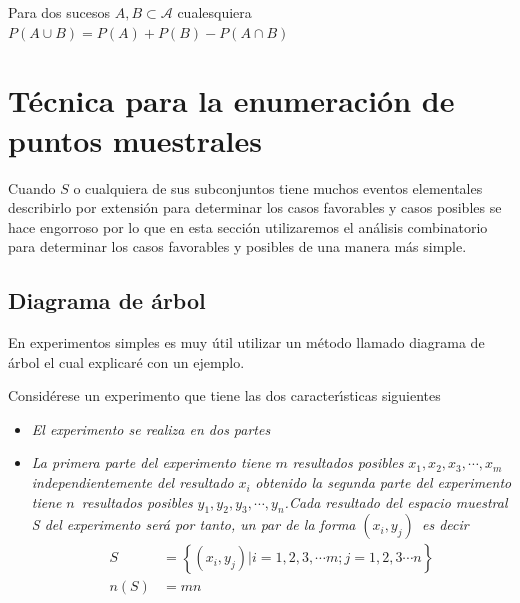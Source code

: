 \documentclass{article}%
\begin{document}
\begin{theorem}
Para dos sucesos $A,B\subset\mathcal{A}$ cualesquiera $P\left(   A\cup
B\right)   =P\left(   A\right)   +P\left(   B\right)   -P\left(   A\cap
B\right)   $
\end{theorem}

\section{T\'{e}cnica para la enumeraci\'{o}n de puntos muestrales}

Cuando $S$ o cualquiera de sus subconjuntos tiene muchos eventos elementales
describirlo por extensi\'{o}n para determinar los casos favorables y casos
posibles se hace engorroso por lo que en esta se\-cci\'{o}n utilizaremos el
an\'{a}lisis combinatorio para determinar los casos favorables y posibles de
una manera m\'{a}s simple.

\subsection{Diagrama de \'{a}rbol}

En experimentos simples es muy \'{u}til utilizar un m\'{e}todo llamado
diagrama de \'{a}rbol el cual explicar\'{e} con un ejemplo.%

\begin{theorem}
Consid\'{e}rese un experimento que tiene las dos cara\-cter\'{\i}sticas
siguientes
\end{theorem}

\begin{itemize}
\item \textit{El experimento se realiza en dos partes }

\item \textit{La primera parte del experimento tiene }$m$ \textit{resultados
posibles }$x_{1},x_{2},x_{3},\cdots,x_{m}$ \textit{independientemente del
resultado} $x_{i}$ \textit{obtenido la segunda parte del experimento tiene
}$n$\textit{\ resultados posibles }$y_{1},y_{2},y_{3},\cdots,y_{n}%
$\textit{.\newline Cada resultado del espacio muestral S del experimento
ser\'{a} por tanto, un par de la forma }$\left(  x_{i},y_{j}\right)
$\textit{\ es decir }
\begin{align*}
S  &  =\left\{  \left(  x_{i},y_{j}\right)  |i=1,2,3,\cdots m;j=1,2,3\cdots
n\right\} \\
n\left(  S\right)   &  =mn
\end{align*}
\end{itemize}
\end{document}
